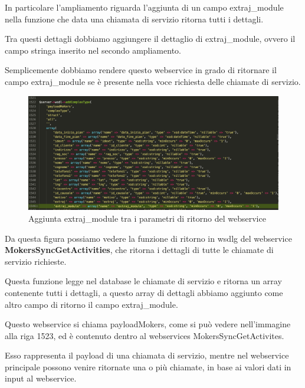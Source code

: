 \begin{flushleft}
	
	In particolare l'ampliamento riguarda l'aggiunta di un campo extraj\_module nella funzione che data una chiamata di servizio ritorna tutti i dettagli.
	
	Tra questi dettagli dobbiamo aggiungere il dettaglio di extraj\_module, ovvero il campo stringa inserito nel secondo ampliamento.
	
	Semplicemente dobbiamo rendere questo webservice in grado di ritornare il campo extraj\_module se è presente nella voce richiesta delle chiamate di servizio.
	
\end{flushleft}
\newspace
\begin{figure}[!h] 
	\centering
	\includegraphics[scale = 0.3]{immagini/webservices/ampliamenti/3ampl__types_getCisa.png}
	\caption{Aggiunta extraj\_module tra i parametri di ritorno del webservice}
\end{figure}
\newspace
\begin{flushleft}
	Da questa figura possiamo vedere la funzione di ritorno in \gls{wsdlg} del webservice \textbf{MokersSyncGetActivities}, che ritorna i dettagli di tutte le chiamate di servizio richieste. 
	\newspace
	
	Questa funzione legge nel database le chiamate di servizio e ritorna un array contenente tutti i dettagli, a questo array di dettagli abbiamo aggiunto come altro campo di ritorno il campo extraj\_module.
	
	\newspace
	
	Questo webservice si chiama payloadMokers, come si può vedere nell'immagine alla riga 1523, ed è contenuto dentro al webservices MokersSyncGetActivites.
	\newspace
	
	Esso rappresenta il payload di una chiamata di servizio, mentre nel webservice principale possono venire ritornate una o più chiamate, in base ai valori dati in input al webservice.
\end{flushleft}

